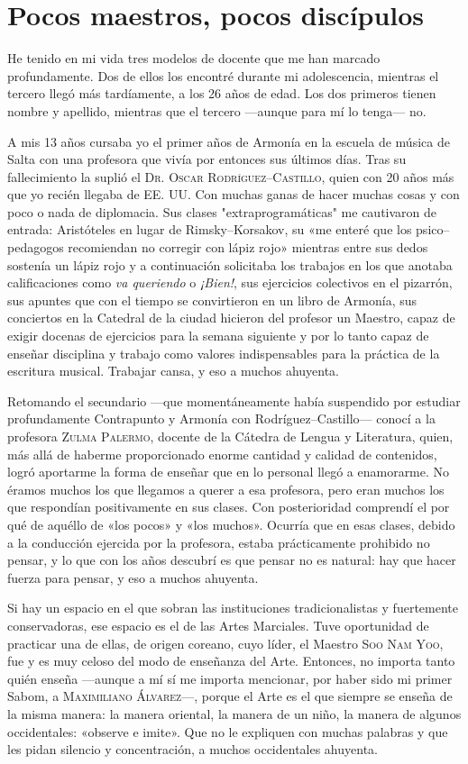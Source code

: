 \chapter {Pocos maestros, pocos discípulos}
He tenido en mi vida tres modelos de docente que me han marcado profundamente. Dos de ellos los encontré durante mi adolescencia, mientras el tercero llegó más tardíamente, a los 26 años de edad. Los dos primeros tienen nombre y apellido, mientras que el tercero ---aunque para mí lo tenga--- no.

A mis 13 años cursaba yo el primer años de Armonía en la escuela de música de Salta con una profesora que vivía por entonces sus últimos días. Tras su fallecimiento la suplió el \textsc{Dr. Oscar Rodríguez--Castillo}, quien con 20 años más que yo recién llegaba de EE. UU. Con muchas ganas de hacer muchas cosas y con poco o nada de diplomacia. Sus clases "extraprogramáticas" me cautivaron de entrada: Aristóteles en lugar de Rimsky--Korsakov, su «me enteré que los psico--pedagogos recomiendan no corregir con lápiz rojo» mientras entre sus dedos sostenía un lápiz rojo y a continuación solicitaba los trabajos en los que anotaba calificaciones como \emph{va queriendo} o \emph{¡Bien!}, sus ejercicios colectivos en el pizarrón, sus apuntes que con el tiempo se convirtieron en un libro de Armonía, sus conciertos en la Catedral de la ciudad hicieron del profesor un Maestro, capaz de exigir docenas de ejercicios para la semana siguiente y por lo tanto capaz de enseñar disciplina y trabajo como valores indispensables para la práctica de la escritura musical. Trabajar cansa, y eso a muchos ahuyenta.

Retomando el secundario ---que momentáneamente había suspendido por estudiar profundamente Contrapunto y Armonía con Rodríguez--Castillo--- conocí a la profesora \textsc{Zulma Palermo}, docente de la Cátedra de Lengua y Literatura, quien, más allá de haberme proporcionado enorme cantidad y calidad de contenidos, logró aportarme la forma de enseñar que en lo personal llegó a enamorarme. No éramos muchos los que llegamos a querer a esa profesora, pero eran muchos los que respondían positivamente en sus clases. Con posterioridad comprendí el por qué de aquéllo de «los pocos» y «los muchos». Ocurría que en esas clases, debido a la conducción ejercida por la profesora, estaba prácticamente prohibido no pensar, y lo que con los años descubrí es que pensar no es natural: hay que hacer fuerza para pensar, y eso a muchos ahuyenta.

Si hay un espacio en el que sobran las instituciones tradicionalistas y fuertemente conservadoras, ese espacio es el de las Artes Marciales. Tuve oportunidad de practicar una de ellas, de origen coreano, cuyo líder, el Maestro \textsc{Soo Nam Yoo}, fue y es muy celoso del modo de enseñanza del Arte. Entonces, no importa tanto quién enseña ---aunque a mí sí me importa mencionar, por haber sido mi primer Sabom, a \textsc{Maximiliano Álvarez}---, porque el Arte es el que siempre se enseña de la misma manera: la manera oriental, la manera de un niño, la manera de algunos occidentales: «observe e imite». Que no le expliquen con muchas palabras y que les pidan silencio y concentración, a muchos occidentales ahuyenta.

